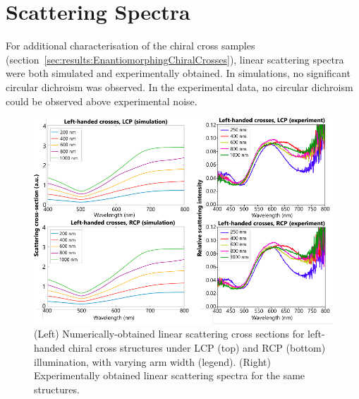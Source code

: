 \section{Scattering Spectra}\label{sec:appendix:CrossesScatteringSpectra}

For additional characterisation of the chiral cross samples (section~\ref{sec:results:EnantiomorphingChiralCrosses}), linear scattering spectra were both simulated and experimentally obtained. In simulations, no significant circular dichroism was observed. In the experimental data, no circular dichroism could be observed above experimental noise.

\begin{figure}[htb!]	
    \centering	
    \includegraphics[scale=1.0]{./figures/results/EnantiomorphingChiralCrosses/scattering_data.pdf}
    \caption{\label{fig:appendix:CrossesScatteringSpectra}
    (Left) Numerically-obtained linear scattering cross sections for left-handed chiral cross structures under LCP (top) and RCP (bottom) illumination, with varying arm width (legend). (Right) Experimentally obtained linear scattering spectra for the same structures. }
\end{figure}